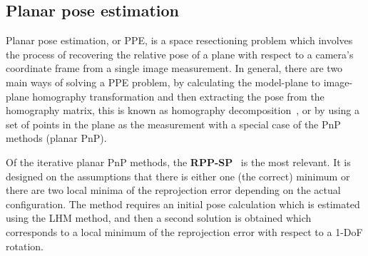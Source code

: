 \documentclass[letterpaper, 10 pt, conference]{ieeeconf}  %
\begin{document}
	\subsection{Planar pose estimation}
	
	
	Planar pose estimation, or PPE, is a space resectioning problem which involves the process of recovering the relative pose of a plane with respect to a camera's coordinate frame from a single image measurement.  In general, there are two main ways of solving a PPE problem, by calculating the model-plane to image-plane homography transformation and then extracting the pose from the homography matrix, this is known as homography decomposition~\cite{Sturm2000,Zhang2000}, or by using a set of points in the plane as the measurement with a special case of the PnP methods (planar PnP).
	
	Of the iterative planar PnP methods, the \textbf{RPP-SP}~\cite{Schweighofer2006} is the most relevant. It is designed on the assumptions that there is either one (the correct) minimum or there are two local minima of the reprojection error depending on the actual configuration. The method requires an initial pose calculation which is estimated using the LHM method, and then a second solution is obtained which corresponds to a local minimum of the reprojection error with respect to a 1-DoF rotation.  %
	
\end{document}
